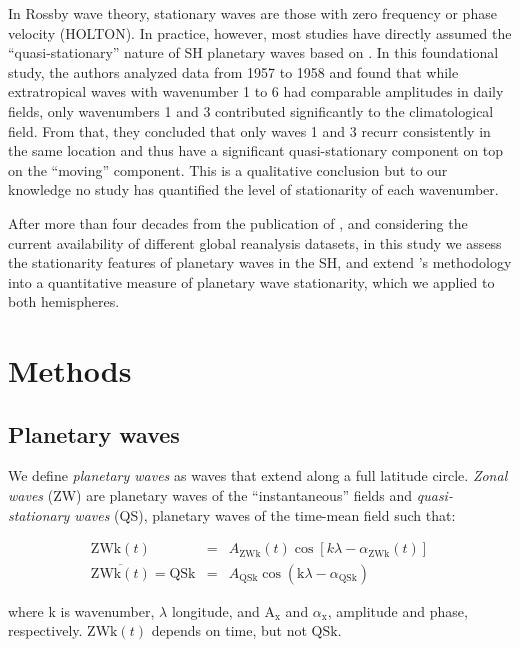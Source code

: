 \documentclass[draft,linenumbers]{agujournal2018}
\begin{document}
In Rossby wave theory, stationary waves are those with zero frequency or
phase velocity (HOLTON). In practice, however, most studies have
directly assumed the ``quasi-stationary'' nature of SH planetary waves
based on \citet{Loon1972}. In this foundational study, the authors
analyzed data from 1957 to 1958 and found that while extratropical waves
with wavenumber 1 to 6 had comparable amplitudes in daily fields, only
wavenumbers 1 and 3 contributed significantly to the climatological
field. From that, they concluded that only waves 1 and 3 recurr
consistently in the same location and thus have a significant
quasi-stationary component on top on the ``moving'' component. This is a
qualitative conclusion but to our knowledge no study has quantified the
level of stationarity of each wavenumber.

After more than four decades from the publication of \citet{Loon1972},
and considering the current availability of different global reanalysis
datasets, in this study we assess the stationarity features of planetary
waves in the SH, and extend \citet{Loon1972}'s methodology into a
quantitative measure of planetary wave stationarity, which we applied to
both hemispheres.

\section{Methods}

\subsection{Planetary waves}

We define \emph{planetary waves} as waves that extend along a full
latitude circle. \emph{Zonal waves} (ZW) are planetary waves of the
``instantaneous'' fields and \emph{quasi-stationary waves} (QS),
planetary waves of the time-mean field such that:

\begin{linenomath*}
\begin{eqnarray}\label{eq:ZW}
\mathrm{ZWk}(t) & = & A_\mathrm{ZWk}(t)\cos \left [ k\lambda - \alpha_\mathrm{ZWk}(t) \right ] \\ 
\overline{\mathrm{ZWk}(t)} = \mathrm{QSk} & = & A_\mathrm{QSk}\cos \left (  \mathrm{k}\lambda - \alpha_\mathrm{QSk} \right ) \label{eq:QS}
\end{eqnarray}
\end{linenomath*}

where \(\mathrm{k}\) is wavenumber, \(\lambda\) longitude, and
\(\mathrm{A_{x}}\) and \(\alpha_\mathrm{x}\), amplitude and phase,
respectively. \(\mathrm{ZWk}(t)\) depends on time, but not
\(\mathrm{QSk}\).
\end{document}

